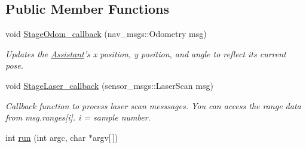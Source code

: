 \subsection*{Public Member Functions}
\begin{DoxyCompactItemize}
\item 
void \hyperlink{classAssistant_ad016061136f3fa5c3ed733e23a54aa00}{Stage\-Odom\-\_\-callback} (nav\-\_\-msgs\-::\-Odometry msg)
\begin{DoxyCompactList}\small\item\em Updates the \hyperlink{classAssistant}{Assistant}'s x position, y position, and angle to reflect its current pose. \end{DoxyCompactList}\item 
void \hyperlink{classAssistant_aaf1fe61dc3d3aac3f0ec603531ad9ad7}{Stage\-Laser\-\_\-callback} (sensor\-\_\-msgs\-::\-Laser\-Scan msg)
\begin{DoxyCompactList}\small\item\em Callback function to process laser scan messsages. You can access the range data from msg.\-ranges\mbox{[}i\mbox{]}. i = sample number. \end{DoxyCompactList}\item 
\hypertarget{classAssistant_adaee2d23c3ba9e0c7ed99642424580de}{int \hyperlink{classAssistant_adaee2d23c3ba9e0c7ed99642424580de}{run} (int argc, char $\ast$argv\mbox{[}$\,$\mbox{]})}\label{classAssistant_adaee2d23c3ba9e0c7ed99642424580de}


\end{DoxyCompactItemize}
